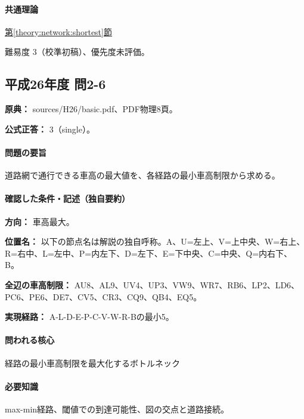 \paragraph{共通理論} \hyperref[theory:network:shortest]{第\ref*{theory:network:shortest}節}

\par 難易度 3（校準初稿）、優先度未評価。

\subsection{平成26年度 問2-6}
\label{q:h26-reg-basic-2-6}

\noindent\textbf{原典：} sources/H26/basic.pdf、PDF物理8頁。

\textbf{公式正答：} 3（single）。

\paragraph{問題の要旨} 道路網で通行できる車高の最大値を、各経路の最小車高制限から求める。

\paragraph{確認した条件・記述（独自要約）}\mbox{}\par

\noindent\textbf{方向：} 車高最大。\par

\noindent\textbf{位置名：} 以下の節点名は解説の独自呼称。A、U=左上、V=上中央、W=右上、R=右中、L=左中、P=内左下、D=左下、E=下中央、C=中央、Q=内右下、B。\par

\noindent\textbf{全辺の車高制限：} AU8、AL9、UV4、UP3、VW9、WR7、RB6、LP2、LD6、PC6、PE6、DE7、CV5、CR3、CQ9、QB4、EQ5。\par

\noindent\textbf{実現経路：} A-L-D-E-P-C-V-W-R-Bの最小5。\par

\paragraph{問われる核心} 経路の最小車高制限を最大化するボトルネック

\paragraph{必要知識} max-min経路、閾値での到達可能性、図の交点と道路接続。

